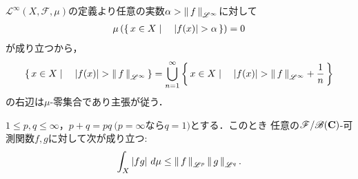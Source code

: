 \begin{prf}
	$\mathscr{L}^\infty(X,\mathscr{F},\mu)$の定義より任意の実数$\alpha > \left\|\, f\, \right\|_{\mathscr{L}^\infty}$に対して
	\begin{align}
		\mu\left( \left\{\, x \in X \mid \quad |f(x)| > \alpha\, \right\} \right) = 0
	\end{align}
	が成り立つから，
	\begin{align}
		\left\{\, x \in X \mid \quad |f(x)| > \left\|\, f\, \right\|_{\mathscr{L}^\infty}\, \right\} = \bigcup_{n =1}^{\infty} \left\{\, x \in X \mid \quad |f(x)| > \left\|\, f\, \right\|_{\mathscr{L}^\infty} + \frac{1}{n}\, \right\}
	\end{align}
	の右辺は$\mu$-零集合であり主張が従う．
	\QED
\end{prf}

\begin{screen}
	\begin{thm}\label{thm:holder_inequality}
		$1 \leq p, q \leq \infty$，$p + q = pq\ (p = \infty$なら$q = 1)$とする．このとき
		任意の$\mathscr{F}/\mathscr{B}(\mathbf{C})$-可測関数$f,g$に対して次が成り立つ:
		\begin{align}
			\int_{X} |fg|\ d\mu \leq \left\|\, f\, \right\|_{\mathscr{L}^p} \left\|\, g\, \right\|_{\mathscr{L}^q}. \label{ineq:holder}
		\end{align}
	\end{thm}
\end{screen}


